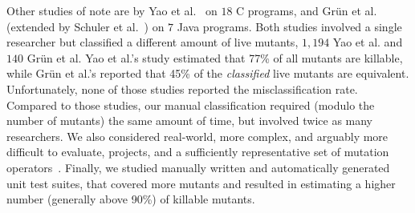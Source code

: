 \documentclass[sigconf,review,anonymous]{acmart}
\begin{document}
%
%
%
Other studies of note are by Yao et al.~\cite{yao2014a} on $18$ C programs,
and Gr\"un et al.~\cite{grun2009impact} (extended by Schuler et al.~\cite{schuler2010covering})
on $7$ Java programs.
%
Both studies involved a single researcher but classified a different amount of live mutants,
$1,194$  Yao et al. and %
$140$ Gr\"un et al.
%
Yao et al.'s study 
estimated that 77\% of all mutants are killable, while Gr\"un et al.'s reported that 
45\% of the \emph{classified} live mutants are equivalent.
%
Unfortunately, none of those studies reported the misclassification rate.
Compared to those studies, 
our manual classification required (modulo the number of mutants) the same amount of time, 
but involved twice as many researchers. We also considered real-world, more complex, and arguably more
difficult to evaluate, projects, and a sufficiently representative set of mutation operators~\cite{gopinath2017mutation}.
Finally, we studied manually written and automatically generated unit test suites, 
that covered more mutants and resulted in estimating a higher number (generally above 90\%) of killable mutants.
\end{document}
